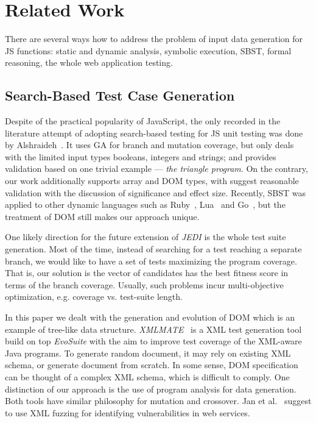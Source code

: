 \documentclass[sigconf,review,anonymous]{acmart}
\begin{document}
\section{Related Work}
\label{sec:related.work}

There are several ways how to address the problem of input data generation for JS functions: static and dynamic analysis, symbolic execution, SBST, formal reasoning, the whole web application testing.


\subsection{Search-Based Test Case Generation}

Despite of the practical popularity of JavaScript, the only recorded in the literature attempt of adopting search-based testing for JS unit testing was done by Alshraideh~\cite{alshraideh2008complete}. It uses GA for branch and mutation coverage, but only deals with the limited input types booleans, integers and strings; and provides validation based on one trivial example --- \emph{the triangle program}. On the contrary, our work additionally supports array and DOM types, with suggest reasonable validation with the discussion of significance and effect size. Recently, SBST was applied to other dynamic languages such as Ruby~\cite{mairhofer2011search}, Lua~\cite{wibowo2015unit} and Go~\cite{irawan2016test}, but the treatment of DOM still makes our approach unique.

One likely direction for the future extension of \emph{JEDI} is the whole test suite generation. Most of the time, instead of searching for a test reaching a separate branch, we would like to have a set of tests maximizing the program coverage. That is, our solution is the vector of candidates has the best fitness score in terms of the branch coverage. Usually, such problems incur multi-objective optimization, e.g. coverage vs. test-suite length.
 
In this paper we dealt with the generation and evolution of DOM which is an example of tree-like data structure. \emph{XMLMATE}~\cite{havrikov2014xmlmate} is a XML test generation tool build on top \emph{EvoSuite} with the aim to improve test coverage of the XML-aware Java programs. To generate random document, it may rely on existing XML schema, or generate document from scratch. In some sense, DOM specification can be thought of a complex XML schema, which is difficult to comply. One distinction of our approach is the use of program analysis for data generation. Both tools have similar philosophy for mutation and crossover. Jan et al.~\cite{jan2016automated} suggest to use XML fuzzing for identifying vulnerabilities in web services. 
\end{document}
